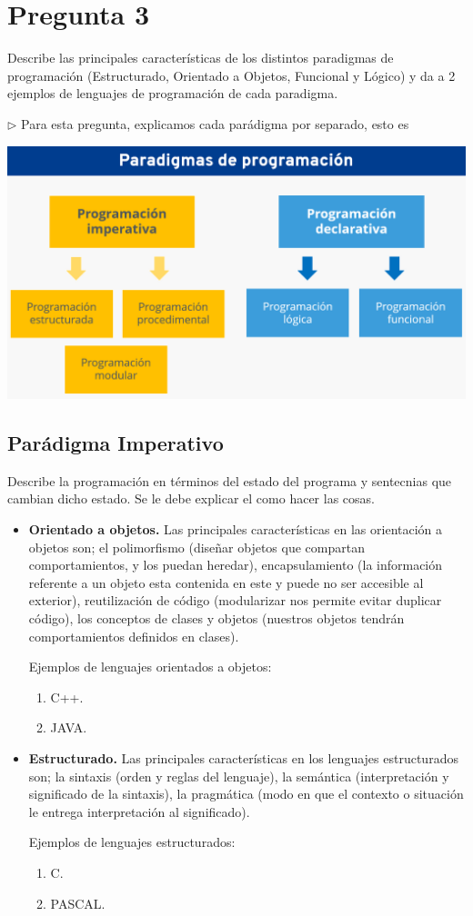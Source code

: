 \newpage
\section*{Pregunta 3}
Describe las principales características de los distintos paradigmas
de programación (Estructurado, Orientado a Objetos, Funcional y Lógico)
y da a 2 ejemplos de lenguajes de programación de cada paradigma.

$\rhd$ Para esta pregunta, explicamos cada parádigma por separado,
esto es
\begin{center}
  \includegraphics[scale=0.40]{./Paradigmas.png}
\end{center}

\subsection*{Parádigma Imperativo}
Describe la programación en términos del estado del programa
y sentecnias que cambian dicho estado. Se le debe explicar
el como hacer las cosas.

\begin{itemize}
\item \textbf{Orientado a objetos.}
Las principales características en las orientación a objetos
son; el polimorfismo (diseñar objetos que compartan comportamientos,
y los puedan heredar), encapsulamiento (la información referente
a un objeto esta contenida en este y puede no ser accesible al
exterior), reutilización de código (modularizar nos permite evitar
duplicar código), los conceptos de clases y objetos (nuestros
objetos tendrán comportamientos definidos en clases).

Ejemplos de lenguajes orientados a objetos:
\begin{enumerate}
\item C++.
\item JAVA.
\end{enumerate}
\item \textbf{Estructurado.}
Las principales características en los lenguajes estructurados
son; la sintaxis (orden y reglas del lenguaje), la semántica
(interpretación y significado de la sintaxis), la pragmática
(modo en que el contexto o situación le entrega interpretación
al significado).

Ejemplos de lenguajes estructurados:
\begin{enumerate}
\item C.
\item PASCAL.
\end{enumerate}
\end{itemize}
